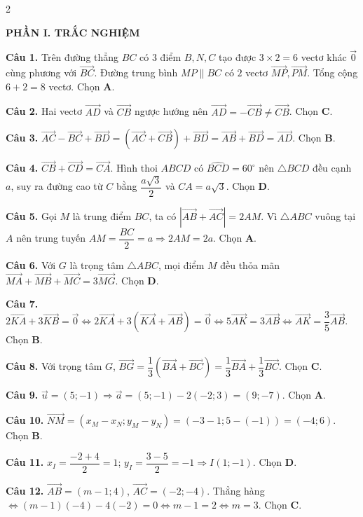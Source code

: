 \documentclass[10pt,a4paper]{article}
\begin{document}
\begin{multicols}{2}
\raggedcolumns
\small

\textbf{\color{accent}PHẦN I. TRẮC NGHIỆM}

\textbf{Câu 1.} Trên đường thẳng $BC$ có $3$ điểm $B, N, C$ tạo được $3\times 2 = 6$ vectơ khác $\vec{0}$ cùng phương với $\vec{BC}$. Đường trung bình $MP \parallel BC$ có $2$ vectơ $\vec{MP}, \vec{PM}$. Tổng cộng $6 + 2 = 8$ vectơ. Chọn \textbf{A}.

\textbf{Câu 2.} Hai vectơ $\vec{AD}$ và $\vec{CB}$ ngược hướng nên $\vec{AD} = -\vec{CB} \neq \vec{CB}$. Chọn \textbf{C}.

\textbf{Câu 3.} $\vec{AC} - \vec{BC} + \vec{BD} = (\vec{AC} + \vec{CB}) + \vec{BD} = \vec{AB} + \vec{BD} = \vec{AD}$. Chọn \textbf{B}.

\textbf{Câu 4.} $\vec{CB} + \vec{CD} = \vec{CA}$. Hình thoi $ABCD$ có $\widehat{BCD} = 60^\circ$ nên $\triangle BCD$ đều cạnh $a$, suy ra đường cao từ $C$ bằng $\dfrac{a\sqrt{3}}{2}$ và $CA = a\sqrt{3}$. Chọn \textbf{D}.

\textbf{Câu 5.} Gọi $M$ là trung điểm $BC$, ta có $|\vec{AB} + \vec{AC}| = 2AM$. Vì $\triangle ABC$ vuông tại $A$ nên trung tuyến $AM = \dfrac{BC}{2} = a \Rightarrow 2AM = 2a$. Chọn \textbf{A}.

\textbf{Câu 6.} Với $G$ là trọng tâm $\triangle ABC$, mọi điểm $M$ đều thỏa mãn $\vec{MA} + \vec{MB} + \vec{MC} = 3\vec{MG}$. Chọn \textbf{D}.

\textbf{Câu 7.} $2\vec{KA} + 3\vec{KB} = \vec{0} \Leftrightarrow 2\vec{KA} + 3(\vec{KA} + \vec{AB}) = \vec{0} \Leftrightarrow 5\vec{AK} = 3\vec{AB} \Leftrightarrow \vec{AK} = \dfrac{3}{5}\vec{AB}$. Chọn \textbf{B}.

\textbf{Câu 8.} Với trọng tâm $G$, $\vec{BG} = \dfrac{1}{3}(\vec{BA} + \vec{BC}) = \dfrac{1}{3}\vec{BA} + \dfrac{1}{3}\vec{BC}$. Chọn \textbf{C}.

\textbf{Câu 9.} $\vec{u} = (5; -1) \Rightarrow \vec{a} = (5; -1) - 2(-2; 3) = (9; -7)$. Chọn \textbf{A}.

\textbf{Câu 10.} $\vec{NM} = (x_M - x_N; y_M - y_N) = (-3 - 1; 5 - (-1)) = (-4; 6)$. Chọn \textbf{B}.

\textbf{Câu 11.} $x_I = \dfrac{-2 + 4}{2} = 1$; $y_I = \dfrac{3 - 5}{2} = -1 \Rightarrow I(1; -1)$. Chọn \textbf{D}.

\textbf{Câu 12.} $\vec{AB} = (m - 1; 4)$, $\vec{AC} = (-2; -4)$. Thẳng hàng $\Leftrightarrow (m - 1)(-4) - 4(-2) = 0 \Leftrightarrow m - 1 = 2 \Leftrightarrow m = 3$. Chọn \textbf{C}.


\end{multicols}
\end{document}
